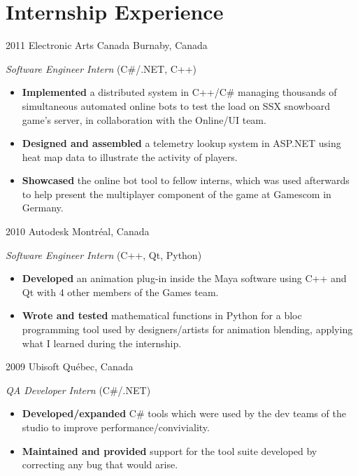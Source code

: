 \documentclass[]{friggeri-cv}
\begin{document}

\section{Internship Experience}

\begin{entrylist}

\entry
{2011}
{Electronic Arts Canada}
{Burnaby, Canada}
{\emph{Software Engineer Intern} (C\#/.NET, C++)
	\begin{itemize}
		\item \textbf{Implemented} a distributed system in C++/C\# managing thousands of simultaneous automated online bots to test the load on SSX snowboard game's server, in collaboration with the Online/UI team.
		\item \textbf{Designed and assembled} a telemetry lookup system in ASP.NET using heat map data to illustrate the activity of players.
		\item \textbf{Showcased} the online bot tool to fellow interns, which was used afterwards to help present the multiplayer component of the game at Gamescom in Germany.
	\end{itemize}}


\entry
{2010}
{Autodesk}
{Montréal, Canada}
{\emph{Software Engineer Intern} (C++, Qt, Python)
\begin{itemize}
	\item \textbf{Developed} an animation plug-in inside the Maya software using C++ and Qt with 4 other members of the Games team.
	\item \textbf{Wrote and tested} mathematical functions in Python for a bloc programming tool used by designers/artists for animation blending, applying what I learned during the internship.
\end{itemize}}


\entry
{2009}
{Ubisoft}
{Québec, Canada}
{\emph{QA Developer Intern} (C\#/.NET)
\begin{itemize}
	\item \textbf{Developed/expanded} C\# tools which were used by the dev teams of the studio to improve performance/conviviality.
	\item \textbf{Maintained and provided} support for the tool suite developed by correcting any bug that would arise.
\end{itemize}}


\end{entrylist}
\end{document}
